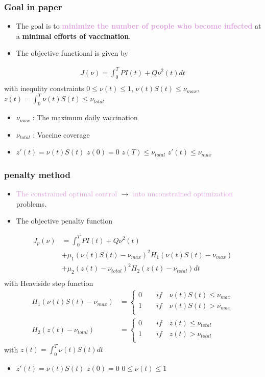 \documentclass[usenames,dvipsnames, aspectratio=169, 9pt]{beamer}
\begin{document}
\begin{frame}\frametitle{Goal in paper}
\begin{itemize}
    \item The goal is to \textcolor{Plum}{\textbf{minimize the number of people who become infected}} at a \textbf{minimal efforts of vaccination}.
    \item The objective functional is given by
\end{itemize}
\begin{align*}
J(\nu) = \int_0^T P I(t) + Q \nu^2(t) dt\\
\end{align*}
with inequlity constraints
$0 \leq \nu(t) \leq 1$, \quad $\nu(t) S(t) \leq \nu_{max}$, \quad $z(t) = \int_0^T \nu(t) S(t) \leq \nu_{total}$\\
\begin{itemize}
    \item $\nu_{max}$ : The maximum daily vaccination
    \item $\nu_{total}$ : Vaccine coverage
    \item $z'(t) = \nu(t) S(t)$ \quad $z(0) = 0$ \quad $z(T) \leq \nu_{total}$ \quad $z'(t) \leq \nu_{max}$
\end{itemize}
\end{frame}

\begin{frame}\frametitle{penalty method}
\begin{itemize}
    \item \textcolor{Plum}{The constrained optimal control} $\rightarrow$ \textcolor{Plum}{into unconstrained optimization} problems.
    \item The objective penalty function
\end{itemize}
\begin{align*}
J_p(\nu) &= \int_0^T P I(t) + Q \nu^2(t) 
\\ &+ \mu_1 (\nu(t) S(t) - \nu_{max})^2 H_1 (\nu(t)S(t) - \nu_{max}) 
\\ &+ \mu_2 (z(t) - \nu_{total})^2 H_2 (z(t) - \nu_{total}) dt\\
\end{align*}
with Heaviside step function
\begin{align*}
H_1 (\nu(t)S(t) - \nu_{max}) &=
\begin{cases}
0 \quad\quad if \quad \nu(t)S(t) \leq \nu_{max} \\ 1 \quad\quad if \quad \nu(t)S(t) > \nu_{max} \\
\end{cases}
\\H_2(z(t) - \nu_{total}) &=
\begin{cases}
0 \quad\quad if \quad z(t) \leq \nu_{total} \\ 1 \quad\quad if \quad z(t) > \nu_{total} \\
\end{cases}
\end{align*}
with $z(t) = \int_0^T \nu(t) S(t) dt$
\begin{itemize} 
    \item $z'(t) = \nu(t)S(t)$ \quad $z(0) = 0$ \quad $0 \leq \nu(t) \leq 1$
\end{itemize}
\end{frame}
\end{document}
